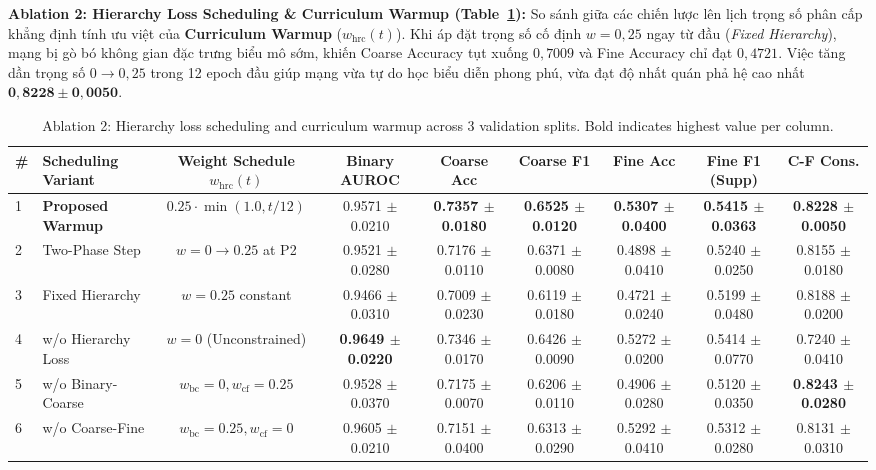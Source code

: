\documentclass[runningheads]{llncs}
\begin{document}
\noindent \textbf{Ablation 2: Hierarchy Loss Scheduling \& Curriculum Warmup (Table~\ref{tab:ablation_hierarchy_schedule}):} 
So sánh giữa các chiến lược lên lịch trọng số phân cấp khẳng định tính ưu việt của \textbf{Curriculum Warmup} ($w_{\text{hrc}}(t)$). Khi áp đặt trọng số cố định $w=0{,}25$ ngay từ đầu (\textit{Fixed Hierarchy}), mạng bị gò bó không gian đặc trưng biểu mô sớm, khiến Coarse Accuracy tụt xuống $0{,}7009$ và Fine Accuracy chỉ đạt $0{,}4721$. Việc tăng dần trọng số $0 \to 0{,}25$ trong 12 epoch đầu giúp mạng vừa tự do học biểu diễn phong phú, vừa đạt độ nhất quán phả hệ cao nhất $\mathbf{0{,}8228 \pm 0{,}0050}$.

\begin{table}[t]
\centering
\caption{Ablation 2: Hierarchy loss scheduling and curriculum warmup across 3 validation splits. Bold indicates highest value per column.}
\label{tab:ablation_hierarchy_schedule}
\begin{adjustbox}{max width=\textwidth}
\begin{tabular}{llccccccc}
\toprule
\textbf{\#} & \textbf{Scheduling Variant} & \textbf{Weight Schedule $w_{\text{hrc}}(t)$} & \textbf{Binary AUROC} & \textbf{Coarse Acc} & \textbf{Coarse F1} & \textbf{Fine Acc} & \textbf{Fine F1 (Supp)} & \textbf{C-F Cons.} \\
\midrule
1 & \textbf{Proposed Warmup} & $0.25 \cdot \min(1.0, t/12)$ & 0.9571 $\pm$ 0.0210 & \textbf{0.7357 $\pm$ 0.0180} & \textbf{0.6525 $\pm$ 0.0120} & \textbf{0.5307 $\pm$ 0.0400} & \textbf{0.5415 $\pm$ 0.0363} & \textbf{0.8228 $\pm$ 0.0050} \\
2 & Two-Phase Step & $w=0 \to 0.25$ at P2 & 0.9521 $\pm$ 0.0280 & 0.7176 $\pm$ 0.0110 & 0.6371 $\pm$ 0.0080 & 0.4898 $\pm$ 0.0410 & 0.5240 $\pm$ 0.0250 & 0.8155 $\pm$ 0.0180 \\
3 & Fixed Hierarchy & $w=0.25$ constant & 0.9466 $\pm$ 0.0310 & 0.7009 $\pm$ 0.0230 & 0.6119 $\pm$ 0.0180 & 0.4721 $\pm$ 0.0240 & 0.5199 $\pm$ 0.0480 & 0.8188 $\pm$ 0.0200 \\
4 & w/o Hierarchy Loss & $w=0$ (Unconstrained) & \textbf{0.9649 $\pm$ 0.0220} & 0.7346 $\pm$ 0.0170 & 0.6426 $\pm$ 0.0090 & 0.5272 $\pm$ 0.0200 & 0.5414 $\pm$ 0.0770 & 0.7240 $\pm$ 0.0410 \\
5 & w/o Binary-Coarse & $w_{\text{bc}}=0, w_{\text{cf}}=0.25$ & 0.9528 $\pm$ 0.0370 & 0.7175 $\pm$ 0.0070 & 0.6206 $\pm$ 0.0110 & 0.4906 $\pm$ 0.0280 & 0.5120 $\pm$ 0.0350 & \textbf{0.8243 $\pm$ 0.0280} \\
6 & w/o Coarse-Fine & $w_{\text{bc}}=0.25, w_{\text{cf}}=0$ & 0.9605 $\pm$ 0.0210 & 0.7151 $\pm$ 0.0400 & 0.6313 $\pm$ 0.0290 & 0.5292 $\pm$ 0.0410 & 0.5312 $\pm$ 0.0280 & 0.8131 $\pm$ 0.0310 \\
\bottomrule
\end{tabular}
\end{adjustbox}
\end{table}
\end{document}
